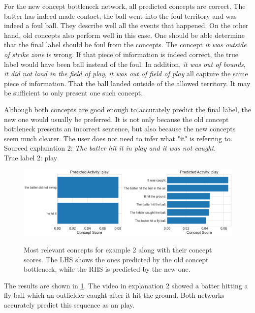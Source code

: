For the new concept bottleneck network, all predicted concepts are correct.
The batter has indeed made contact, the ball went into the foul territory and was indeed a foul ball.
They describe well all the events that happened.
On the other hand, old concepts also perform well in this case.
One should be able determine that the final label should be foul from the concepts. 
The concept \emph{it was outside of strike zone} is wrong. 
If that piece of information is indeed correct, the true label would have been ball instead of the foul.
In addition, \emph{it was out of bounds}, \emph{it did not land in the field of play}, \emph{it was out of field of play} all capture the same piece of information.
That the ball landed outside of the allowed territory.
It may be sufficient to only present one such concept.

Although both concepts are good enough to accurately predict the final label, the new one would usually be preferred.
It is not only because the old concept bottleneck presents an incorrect sentence, but also because the new concepts seem much clearer.
The user does not need to infer what "it" is referring to. \\

Sourced explanation 2: \emph{The batter hit it in play and it was not caught.} \\
True label 2: play

\begin{figure}[h]
\caption{Most relevant concepts for example 2 along with their concept scores. The LHS shows the ones predicted by the old concept bottleneck, while the RHS is predicted by the new one.}
\centering
\includegraphics[width=\textwidth]{concept-bottleneck-pipeline/expalantions_concepts2.png}
\label{concepts-results-2}
\end{figure}

The results are shown in \ref{concepts-results-2}.
The video in explanation 2 showed a batter hitting a fly ball which an outfielder caught after it hit the ground.
Both networks accurately predict this sequence as an play.

